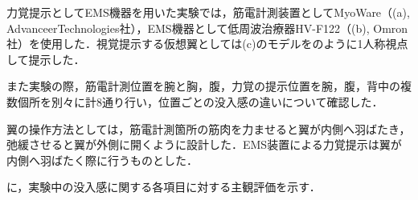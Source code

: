     力覚提示としてEMS機器を用いた実験では，筋電計測装置としてMyoWare（(a), AdvanceerTechnologies社），EMS機器として低周波治療器HV-F122（(b), Omron社）を使用した．視覚提示する仮想翼としては(c)のモデルをのように1人称視点して提示した．

    また実験の際，筋電計測位置を腕と胸，腹，力覚の提示位置を腕，腹，背中の複数個所を別々に計8通り行い，位置ごとの没入感の違いについて確認した．

    翼の操作方法としては，筋電計測箇所の筋肉を力ませると翼が内側へ羽ばたき，弛緩させると翼が外側に開くように設計した．EMS装置による力覚提示は翼が内側へ羽ばたく際に行うものとした．


    に，実験中の没入感に関する各項目に対する主観評価を示す．
    
